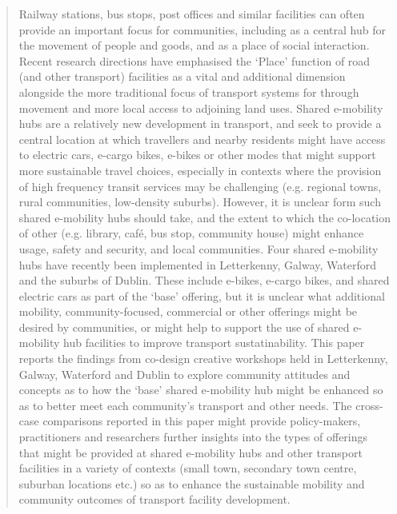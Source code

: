 \documentclass[preprint,12pt,authoryear]{elsarticle}
\begin{document}
\begin{frontmatter}



\begin{abstract}
Railway stations, bus stops, post offices and similar facilities can often provide an important focus for communities, including as a central hub for the movement of people and goods, and as a place of social interaction. Recent research directions have emphasised the ‘Place’ function of road (and other transport) facilities as a vital and additional dimension alongside the more traditional focus of transport systems for through movement and more local access to adjoining land uses.  Shared e-mobility hubs are a relatively new development in transport, and seek to provide a central location at which travellers and nearby residents might have access to electric cars, e-cargo bikes, e-bikes or other modes that might support more sustainable travel choices, especially in contexts where the provision of high frequency transit services may be challenging (e.g. regional towns, rural communities, low-density suburbs). However, it is unclear form such shared e-mobility hubs should take, and the extent to which the co-location of other (e.g. library, café, bus stop, community house) might enhance usage, safety and security, and local communities.  Four shared e-mobility hubs have recently been implemented in Letterkenny, Galway, Waterford and the suburbs of Dublin. These include e-bikes, e-cargo bikes, and shared electric cars as part of the ‘base’ offering, but it is unclear what additional mobility, community-focused, commercial or other offerings might be desired by communities, or might help to support the use of shared e-mobility hub facilities to improve transport sustatinability. This paper reports the findings from co-design creative workshops held in Letterkenny, Galway, Waterford and Dublin to explore community attitudes and concepts as to how the ‘base’ shared e-mobility hub might be enhanced so as to better meet each community’s transport and other needs. The cross-case comparisons reported in this paper might provide policy-makers, practitioners and researchers further insights into the types of offerings that might be provided at shared e-mobility hubs and other transport facilities in a variety of contexts (small town, secondary town centre, suburban locations etc.) so as to enhance the sustainable mobility and community outcomes of transport facility development.
\end{abstract}


\end{frontmatter}
\end{document}
